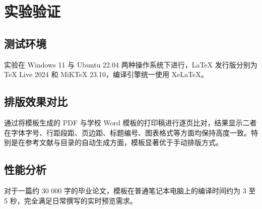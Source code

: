 
\section{实验验证}

\subsection{测试环境}

实验在 Windows 11 与 Ubuntu 22.04 两种操作系统下进行，\LaTeX{} 发行版分别为 TeX Live 2024 和 MiKTeX 23.10，编译引擎统一使用 XeLaTeX。

\subsection{排版效果对比}

通过将模板生成的 PDF 与学校 Word 模板的打印稿进行逐页比对，结果显示二者在字体字号、行距段距、页边距、标题编号、图表格式等方面均保持高度一致。特别是在参考文献与目录的自动生成方面，模板显著优于手动排版方式。

\subsection{性能分析}

对于一篇约 30 000 字的毕业论文，模板在普通笔记本电脑上的编译时间约为 3 至 5 秒，完全满足日常撰写的实时预览需求。
